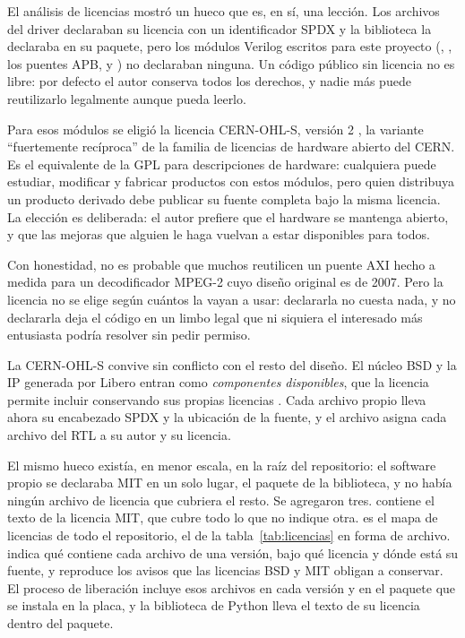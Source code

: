 El análisis de licencias mostró un hueco que es, en sí, una lección. Los
archivos del driver declaraban su licencia con un identificador SPDX y la
biblioteca la declaraba en su paquete, pero los módulos Verilog escritos para
este proyecto (, , los puentes APB,
 y ) no declaraban ninguna. Un código
público sin licencia no es libre: por defecto el autor conserva todos los
derechos, y nadie más puede reutilizarlo legalmente aunque pueda leerlo.

Para esos módulos se eligió la licencia CERN-OHL-S, versión 2
\citep{CERN_OHL_S_2020}, la variante \enquote{fuertemente recíproca} de la
familia de licencias de hardware abierto del CERN. Es el equivalente de la GPL
para descripciones de hardware: cualquiera puede estudiar, modificar y
fabricar productos con estos módulos, pero quien distribuya un producto
derivado debe publicar su fuente completa bajo la misma licencia. La elección
es deliberada: el autor prefiere que el hardware se mantenga abierto, y que
las mejoras que alguien le haga vuelvan a estar disponibles para todos.

Con honestidad, no es probable que muchos reutilicen un puente AXI hecho a
medida para un decodificador MPEG-2 cuyo diseño original es de 2007. Pero la
licencia no se elige según cuántos la vayan a usar: declararla no cuesta
nada, y no declararla deja el código en un limbo legal que ni siquiera el
interesado más entusiasta podría resolver sin pedir permiso.

La CERN-OHL-S convive sin conflicto con el resto del diseño. El núcleo BSD y
la IP generada por Libero entran como \emph{componentes disponibles}, que la
licencia permite incluir conservando sus propias licencias
\citep[§1.7 y §4.1]{CERN_OHL_S_2020}. Cada archivo propio lleva ahora su
encabezado SPDX y la ubicación de la fuente, y el archivo
 asigna cada archivo del RTL a su autor y su licencia.

El mismo hueco existía, en menor escala, en la raíz del repositorio: el
software propio se declaraba MIT en un solo lugar, el paquete de la
biblioteca, y no había ningún archivo de licencia que cubriera el resto. Se
agregaron tres.  contiene el texto de la licencia MIT, que
cubre todo lo que no indique otra.  es el mapa de licencias
de todo el repositorio, el de la tabla~\ref{tab:licencias} en forma de
archivo.  indica qué contiene cada archivo
de una versión, bajo qué licencia y dónde está su fuente, y reproduce los
avisos que las licencias BSD y MIT obligan a conservar. El proceso de
liberación incluye esos archivos en cada versión y en el paquete que se
instala en la placa, y la biblioteca de Python lleva el texto de su licencia
dentro del paquete.


